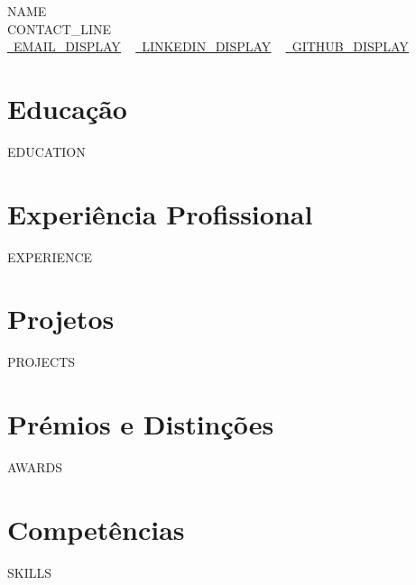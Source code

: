 \documentclass[letterpaper,11pt]{article}
\newcommand{\resumeSubHeadingListStart}{\begin{itemize}[leftmargin=0.0in, label={}]}
\newcommand{\resumeSubHeadingListEnd}{\end{itemize}}
\begin{document}
    \begin{center}
        {\Huge\scshape {{NAME}}}
        \\ {{CONTACT_LINE}}\\
        \small
        \href{{{EMAIL_URL}}}{\raisebox{-0.2\height}\faEnvelope\  \underline{{{EMAIL_DISPLAY}}}} ~
        \href{{{LINKEDIN_URL}}}{\raisebox{-0.2\height}\faLinkedin\ \underline{{{LINKEDIN_DISPLAY}}}}  ~
        \href{{{GITHUB_URL}}}{\raisebox{-0.2\height}\faGithub\ \underline{{{GITHUB_DISPLAY}}}}
    \end{center}

\section{Educação}
  \resumeSubHeadingListStart
{{EDUCATION}}
  \resumeSubHeadingListEnd

\section{Experiência Profissional}
  \resumeSubHeadingListStart
{{EXPERIENCE}}
  \resumeSubHeadingListEnd

\section{Projetos}
\resumeSubHeadingListStart
{{PROJECTS}}
\resumeSubHeadingListEnd

\section{Prémios e Distinções}
\resumeSubHeadingListStart
{{AWARDS}}
\resumeSubHeadingListEnd

\section{Competências}
\vspace{-7pt}
\begin{itemize}
[leftmargin=0.15in, label={}]\small{\item{
{{SKILLS}}
}}
\end{itemize}

\end{document}
